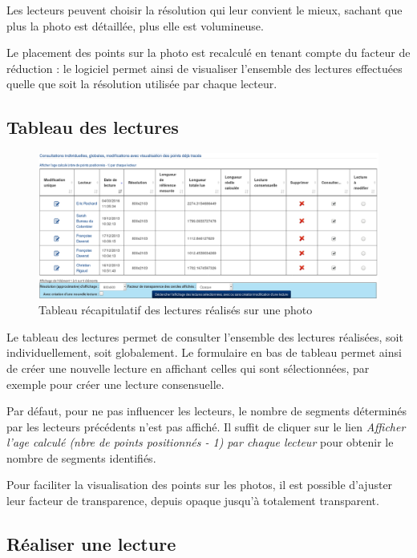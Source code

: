 Les lecteurs peuvent choisir la résolution qui leur convient le mieux, sachant que plus la photo est détaillée, plus elle est volumineuse. 

Le placement des points sur la photo est recalculé en tenant compte du facteur de réduction : le logiciel permet ainsi de visualiser l'ensemble des lectures effectuées quelle que soit la résolution utilisée par chaque lecteur.

\subsection{Tableau des lectures}

\begin{figure}[H]
\centering
\includegraphics[width=\linewidth]{images/lectureTableau}
\caption{Tableau récapitulatif des lectures réalisés sur une photo}
\end{figure}

Le tableau des lectures permet de consulter l'ensemble des lectures réalisées, soit individuellement, soit globalement. Le formulaire en bas de tableau permet ainsi de créer une nouvelle lecture en affichant celles qui sont sélectionnées, par exemple pour créer une lecture consensuelle.

Par défaut, pour ne pas influencer les lecteurs, le nombre de segments déterminés par les lecteurs précédents n'est pas affiché. Il suffit de cliquer sur le lien \textit{Afficher l'age calculé (nbre de points positionnés - 1) par chaque lecteur} pour obtenir le nombre de segments identifiés.

Pour faciliter la visualisation des points sur les photos, il est possible d'ajuster leur facteur de transparence, depuis opaque jusqu'à totalement transparent.

\subsection{Réaliser une lecture}


